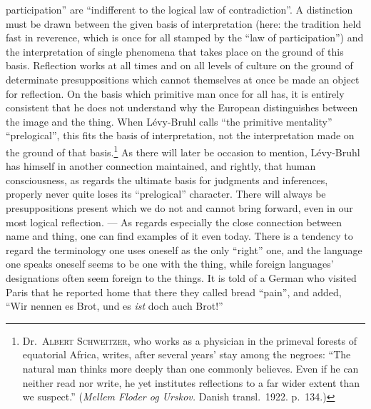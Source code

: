 \documentclass[12pt]{book}
\newcommand{\opage}[1]{\marginnote{\footnotesize\textit{[#1]}}}
\begin{document}
participation'' are ``indifferent to the logical law of contradiction''. A
distinction must be drawn between the given basis of interpretation (here: the
tradition held fast in reverence, which is once for all stamped by the ``law of
participation'') and the interpretation of single phenomena that takes place on
the ground of this basis. Reflection works at all times and on all levels of
culture on the ground of determinate presuppositions which cannot themselves at
once be made an object for reflection. On the basis which primitive man once
for all has, it is entirely consistent that he does not understand why the
European distinguishes between the image and the thing. When Lévy-Bruhl calls
``the primitive mentality'' ``prelogical'', this fits the basis of
interpretation, not the interpretation made on the ground of that
basis.\footnote{Dr.\ \textsc{Albert Schweitzer}, who works as a physician in
the primeval forests of equatorial Africa, writes, after several years' stay
among the negroes: ``The natural man thinks more deeply than one commonly
believes. Even if he can neither read nor write, he yet institutes reflections
to a far wider extent than we suspect.'' (\textit{Mellem Floder og Urskov.}
Danish transl.\ 1922. p.\ 134.)} As there will later be occasion to mention,
Lévy-Bruhl has himself in another connection maintained, and rightly, that
human consciousness, as regards the ultimate basis for judgments and
inferences, properly never quite loses its ``prelogical'' character. There will
always be presuppositions present which we do not and cannot bring forward,
even in our most logical reflection. --- As regards especially the close
connection between name and thing, one can find examples of it even today.
There is a tendency to regard the terminology one uses oneself as the only
``right'' one, and the language one speaks oneself seems to \opage{12}be one with the
thing, while foreign languages' designations often seem foreign to the things.
It is told of a German who visited Paris that he reported home that there they
called bread ``pain'', and added, ``Wir nennen es Brot, und es \textit{ist} doch auch
Brot!''
\end{document}
